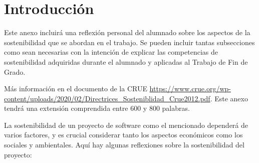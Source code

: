 
\section{Introducción}
Este anexo incluirá una reflexión personal del alumnado sobre los aspectos de la sostenibilidad 
que se abordan en el trabajo.
Se pueden incluir tantas subsecciones como sean necesarias con la intención de explicar 
las competencias de sostenibilidad adquiridas durante el alumnado y aplicadas al Trabajo de Fin de Grado.

Más información en el documento de la CRUE 
\url{https://www.crue.org/wp-content/uploads/2020/02/Directrices_Sosteniblidad_Crue2012.pdf}.
Este anexo tendrá una extensión comprendida entre 600 y 800 palabras.

La sostenibilidad de un proyecto de software como el mencionado dependerá de varios factores, 
y es crucial considerar tanto los aspectos económicos como los sociales y ambientales. 
Aquí hay algunas reflexiones sobre la sostenibilidad del proyecto:

